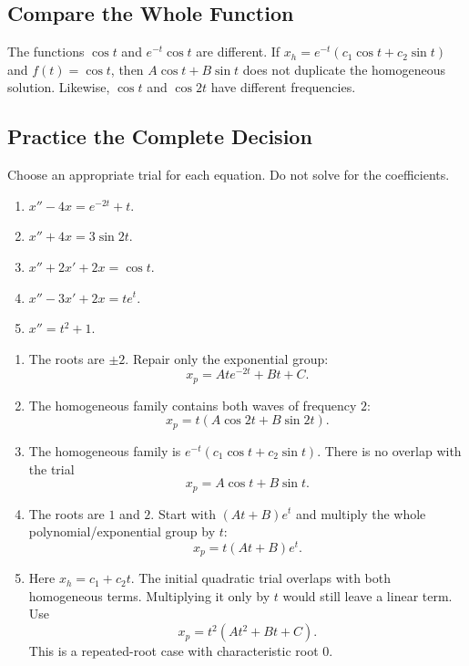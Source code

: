 \documentclass[10pt,letterpaper]{article}
\begin{document}
\subsection{Compare the Whole Function}
The functions $\cos t$ and $e^{-t}\cos t$ are different. If
$x_h=e^{-t}(c_1\cos t+c_2\sin t)$ and $f(t)=\cos t$, then
$A\cos t+B\sin t$ does not duplicate the homogeneous solution.
Likewise, $\cos t$ and $\cos 2t$ have different frequencies.

\subsection{Practice the Complete Decision}
\begin{example}{Choose an appropriate trial for each equation. Do not solve for the coefficients.
\begin{enumerate}
\item $x''-4x=e^{-2t}+t$.
\item $x''+4x=3\sin 2t$.
\item $x''+2x'+2x=\cos t$.
\item $x''-3x'+2x=te^t$.
\item $x''=t^2+1$.
\end{enumerate}}
\begin{enumerate}
\item The roots are $\pm2$. Repair only the exponential group:
\[x_p=Ate^{-2t}+Bt+C.\]
\item The homogeneous family contains both waves of frequency $2$:
\[x_p=t(A\cos 2t+B\sin 2t).\]
\item The homogeneous family is $e^{-t}(c_1\cos t+c_2\sin t)$.
There is no overlap with the trial
\[x_p=A\cos t+B\sin t.\]
\item The roots are $1$ and $2$. Start with $(At+B)e^t$ and
multiply the whole polynomial/exponential group by $t$:
\[x_p=t(At+B)e^t.\]
\item Here $x_h=c_1+c_2t$. The initial quadratic trial overlaps with both
homogeneous terms. Multiplying it only by $t$ would still leave a linear term.
Use
\[x_p=t^2(At^2+Bt+C).\]
This is a repeated-root case with characteristic root $0$.
\end{enumerate}
\end{example}
\end{document}
